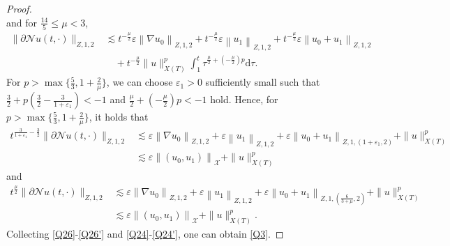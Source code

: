 \documentclass[11pt,twoside]{article}
\newcommand{\p}{\partial}
\newcommand{\ve}{\varepsilon}
\newcommand{\f}{\frac}
\theoremstyle{plain}
\theoremstyle{definition}
\theoremstyle{remark}
\numberwithin{equation}{section}
\begin{document}
\begin{proof}
$$$$
and for $\f{14}{5}\leq\mu<3$,
$$
\begin{aligned}
\|\p \mathcal{N}u(t, \cdot)\|_{Z, 1, 2} &\lesssim t^{-\f{\mu}{2}}\ve\left\|\nabla u_0\right\|_{Z, 1, 2}
+t^{-\f{\mu}{2}}\ve\left\|u_1\right\|_{Z, 1, 2}+t^{-\f{\mu}{2}}\ve\left\|u_0+u_1\right\|_{Z, 1,2}\\
&\quad+ t^{-\f{\mu}{2}}\|u\|_{X(T)}^p\int_{1}^{t} \tau^{\f{\mu}{2}+(-\f{\mu}{2})p}\mathrm{d}\tau.
\end{aligned}
$$
For $p>\max\{\f53, 1+\f{2}{\mu}\}$, we can choose $\varepsilon_1>0$ sufficiently small  such that $\f32+p(\f32-\f{3}{1+\ve_1})<-1$ and $\f{\mu}{2}+(-\f{\mu}{2})p<-1$ hold.
Hence, for $p>\max\{\f53, 1+\f{2}{\mu}\}$, it holds that
\begin{equation}\label{Q24}
\begin{aligned}
t^{\f{3}{1+\ve_1}-\f32}\|\p \mathcal{N} u(t, \cdot)\|_{Z, 1,2} &\lesssim \ve\left\|\nabla u_0\right\|_{Z, 1,2}+\ve\left\|u_1\right\|_{Z, 1,2}
+\ve\left\|u_0+u_1\right\|_{Z, 1, (1+\ve_1, 2)} +\|u\|_{X(T)}^p\\
&  \lesssim \ve\left\|\left(u_{0}, u_{1}\right)\right\|_{\mathcal{X}}+ \|u\|_{X(T)}^p
\end{aligned}
\end{equation}
and
\begin{equation}\label{Q24'}
\begin{aligned}
t^{\f{\mu}{2}}\|\p \mathcal{N} u(t, \cdot)\|_{Z, 1,2} &\lesssim \ve\left\|\nabla u_0\right\|_{Z, 1,2}+\ve\left\|u_1\right\|_{Z, 1,2}
+\ve\left\|u_0+u_1\right\|_{Z, 1, (\f{6}{3+\mu}, 2)} +\|u\|_{X(T)}^p\\
&  \lesssim \ve\left\|\left(u_{0}, u_{1}\right)\right\|_{\mathcal{X}}+ \|u\|_{X(T)}^p.
\end{aligned}
\end{equation}
Collecting \eqref{Q26}-\eqref{Q26'} and \eqref{Q24}-\eqref{Q24'}, one can obtain  \eqref{Q3}.


\end{proof}
\end{document}
